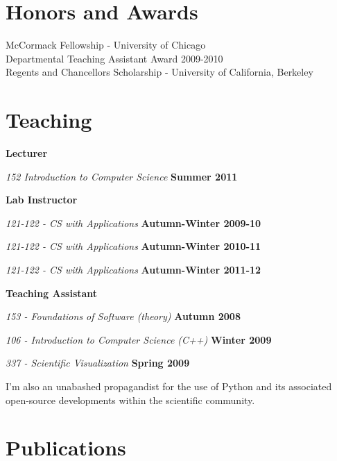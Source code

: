 \documentclass[margin,line]{res}
\newenvironment{list1}{
  \begin{list}{\ding{113}}{%
      \setlength{\itemsep}{0in}
      \setlength{\parsep}{0in} \setlength{\parskip}{0in}
      \setlength{\topsep}{0in} \setlength{\partopsep}{0in} 
      \setlength{\leftmargin}{0.17in}}}{\end{list}}
\begin{document}
\begin{resume}
\section{\sc Honors and Awards} 

McCormack Fellowship - University of Chicago\\
Departmental Teaching Assistant Award 2009-2010\\
Regents and Chancellors Scholarship - University of California, Berkeley\\

\section {\sc Teaching}

{\bf Lecturer}
\begin{list1}
\item[] {\em 152 Introduction to Computer Science} \hfill {\bf Summer 2011}
\end{list1}

{\bf Lab Instructor}
\begin{list1}
\item[] {\em 121-122 - CS with Applications}  \hfill {\bf Autumn-Winter 2009-10}
\item[] {\em 121-122 - CS with Applications}  \hfill {\bf Autumn-Winter 2010-11}
\item[] {\em 121-122 - CS with Applications}  \hfill {\bf Autumn-Winter 2011-12}
\end{list1}

{\bf Teaching Assistant}
\begin{list1}
\item[] {\em 153 - Foundations of Software (theory)} \hfill {\bf Autumn 2008}
\item[] {\em 106 - Introduction to Computer Science (C++)} \hfill {\bf Winter 2009}
\item[] {\em 337 - Scientific Visualization} \hfill {\bf Spring 2009}
\end{list1}


I'm also an unabashed propagandist for the use of Python and its associated open-source developments within the scientific community.\\

\section{\sc Publications}


\end{resume}
\end{document}
